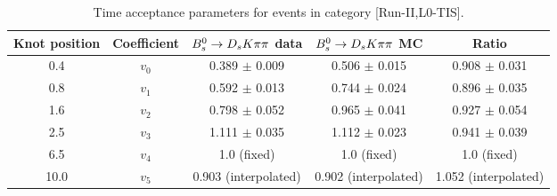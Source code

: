 \begin{table}[hp!]
\centering
\small
\caption{Time acceptance parameters for events in category [\textsf{Run-II},\textsf{L0-TIS}].}
\begin{tabular}{c c c c c}
\hline
\hline
Knot position & Coefficient & ${{B}^0_{s}}\rightarrow{\ensuremath{{D}_{s}}}{\ensuremath{K}}{\ensuremath{\pi}}{\ensuremath{\pi}}$ data & ${{B}^0_{s}}\rightarrow{\ensuremath{{D}_{s}}}{\ensuremath{K}}{\ensuremath{\pi}}{\ensuremath{\pi}}$ MC & Ratio \\
\hline
0.4 & $v_{0}$ & 0.389 $\pm$ 0.009 & 0.506 $\pm$ 0.015 & 0.908 $\pm$ 0.031\\
0.8 & $v_{1}$ & 0.592 $\pm$ 0.013 & 0.744 $\pm$ 0.024 & 0.896 $\pm$ 0.035\\
1.6 & $v_{2}$ & 0.798 $\pm$ 0.052 & 0.965 $\pm$ 0.041 & 0.927 $\pm$ 0.054\\
2.5 & $v_{3}$ & 1.111 $\pm$ 0.035 & 1.112 $\pm$ 0.023 & 0.941 $\pm$ 0.039\\
6.5 & $v_{4}$ &  1.0 (fixed) & 1.0 (fixed) & 1.0 (fixed)\\
10.0 & $v_{5}$ & 0.903 (interpolated) & 0.902 (interpolated) & 1.052 (interpolated) \\
\hline
\hline
\end{tabular}
\label{table:splines}
\end{table}